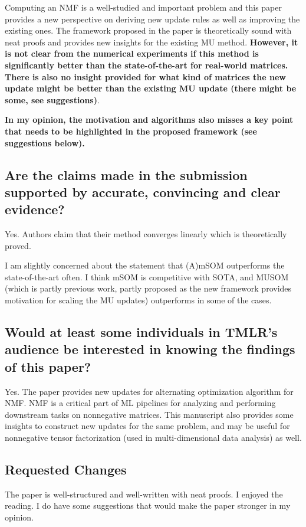 \documentclass[10pt]{article} %
\begin{document}
Computing an NMF is a well-studied and important problem and this paper provides a new perspective on deriving new update rules as well as improving the existing ones. The framework proposed in the paper is theoretically sound with neat proofs and provides new insights for the existing MU method. \textbf{However, it is not clear from the numerical experiments if this method is significantly better than the state-of-the-art for real-world matrices. There is also no insight provided for what kind of matrices the new update might be better than the existing MU update (there might be some, see suggestions)}.

\textbf{In my opinion, the motivation and algorithms also misses a key point that needs to be highlighted in the proposed framework (see suggestions below).}

\subsection{Are the claims made in the submission supported by accurate, convincing and clear evidence?} Yes. Authors claim that their method converges linearly which is theoretically proved.

I am slightly concerned about the statement that (A)mSOM outperforms the state-of-the-art often. I think mSOM is competitive with SOTA, and MUSOM (which is partly previous work, partly proposed as the new framework provides motivation for scaling the MU updates) outperforms in some of the cases.

\subsection{Would at least some individuals in TMLR's audience be interested in knowing the findings of this paper?}
Yes. The paper provides new updates for alternating optimization algorithm for NMF. NMF is a critical part of ML pipelines for analyzing and performing downstream tasks on nonnegative matrices. This manuscript also provides some insights to construct new updates for the same problem, and may be useful for nonnegative tensor factorization (used in multi-dimensional data analysis) as well.

\subsection{Requested Changes}
The paper is well-structured and well-written with neat proofs. I enjoyed the reading. I do have some suggestions that would make the paper stronger in my opinion.
\end{document}

